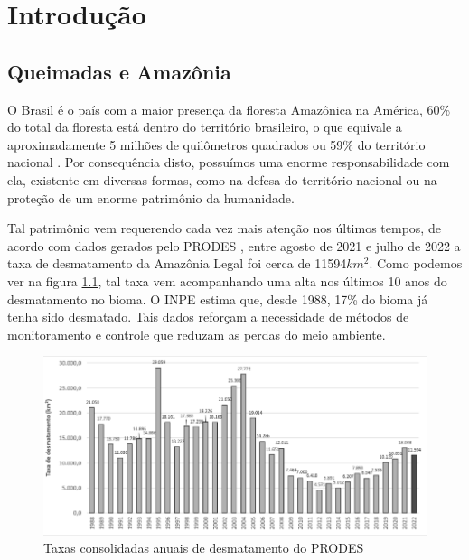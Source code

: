 \chapter{Introdução}
\label{cap_intr}
\section{Queimadas e Amazônia}
O Brasil é o país com a maior presença da floresta Amazônica na América, 60\% do total da floresta está dentro do território brasileiro, o que equivale a aproximadamente 5 milhões de quilômetros quadrados ou 59\% do território nacional \cite{tamanhoIBGE}. Por consequência disto, possuímos uma enorme responsabilidade com ela, existente em diversas formas, como na defesa do território nacional ou na proteção de um enorme patrimônio da humanidade. 

Tal patrimônio vem requerendo cada vez mais atenção nos últimos tempos, de acordo com dados gerados pelo PRODES \cite{novatecnica}, entre agosto de 2021 e julho de 2022 a taxa de desmatamento da Amazônia Legal foi cerca de 11594$km^{2}$. Como podemos ver na figura \ref{fig:prodesgraph}, tal taxa vem acompanhando uma alta nos últimos 10 anos do desmatamento no bioma. O INPE \cite{INPE} estima que, desde 1988, 17\% do bioma já tenha sido desmatado. Tais dados reforçam a necessidade de métodos de monitoramento e controle que reduzam as perdas do meio ambiente.

\begin{figure}[htb]
	\centering
	\begin{minipage}{0.9\linewidth}
		\centering
		\includegraphics[width=\linewidth]{tg1/figuras/prodes.png}
		\caption{Taxas consolidadas anuais de desmatamento do PRODES \cite{novatecnica}}
            \label{fig:prodesgraph}
	\end{minipage}
\end{figure}

